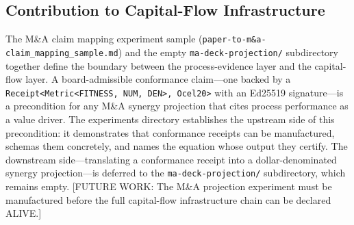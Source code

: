 \subsection{Contribution to Capital-Flow Infrastructure}
\label{sec:experiments-core-contribution-capital}

The M\&A claim mapping experiment sample (\texttt{paper-to-m\&a-claim\_mapping\_sample.md})
and the empty \texttt{ma-deck-projection/} subdirectory together define the boundary
between the process-evidence layer and the capital-flow layer. A board-admissible
conformance claim---one backed by a \texttt{Receipt<Metric<FITNESS, NUM, DEN>, Ocel20>}
with an Ed25519 signature---is a precondition for any M\&A synergy projection that
cites process performance as a value driver. The experiments directory establishes
the upstream side of this precondition: it demonstrates that conformance receipts
can be manufactured, schemas them concretely, and names the equation whose output
they certify. The downstream side---translating a conformance receipt into a
dollar-denominated synergy projection---is deferred to the \texttt{ma-deck-projection/}
subdirectory, which remains empty. [FUTURE WORK: The M\&A projection experiment
must be manufactured before the full capital-flow infrastructure chain can be
declared ALIVE.]

